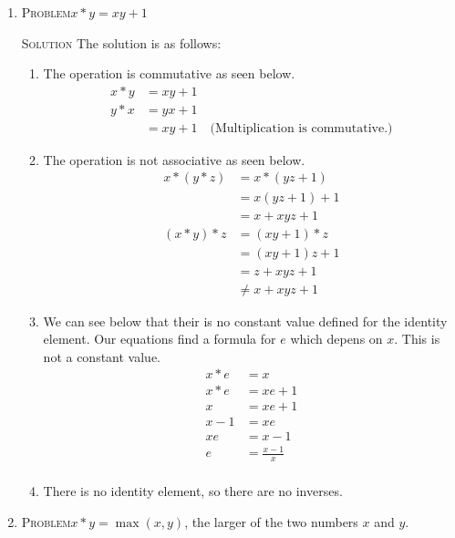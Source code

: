 \documentclass[draft,twoside]{amsart}
\newcommand{\Solution}{\textsc{Solution}\xspace}
\newcommand{\Problem}{\textsc{Problem}\xspace}
\begin{document}
\begin{enumerate}
   \item \Problem $x*y = xy + 1$

   \noindent \Solution The solution is as follows:

   \begin{enumerate}

      \item The operation is commutative as seen below.
      \begin{align*}
         x * y & = xy + 1  \\
	 y * x & = yx + 1 \\
	       & = xy + 1 \quad\text{(Multiplication is commutative.)}
      \end{align*}

      \item The operation is not associative as seen below.
      \begin{align*}
         x * (y * z) & = x * (yz + 1) \\
	             & = x(yz + 1) + 1 \\
		     & = x + xyz + 1 \\
	 (x * y) * z & = (xy + 1) * z \\
	             & = (xy + 1)z + 1 \\
		     & = z + xyz + 1 \\
		     & \ne x + xyz + 1
      \end{align*}

      \item We can see below that their is no constant value defined for
      the identity element. Our equations find a formula for $e$ which
      depens on $x$. This is not a constant value.
      \begin{align*}
         x * e & = x \\
	 x * e & = xe + 1 \\
	     x & = xe + 1 \\
	 x - 1 & = xe     \\
	 xe    & = x - 1  \\
	  e    & = \frac{x - 1}{x} \\
      \end{align*}

      \item There is no identity element, so there are no inverses.
   \end{enumerate}

   \item \Problem $x * y = \max(x,y)$, the larger of the two numbers $x$ and $y$.


\end{enumerate}
\end{document}
